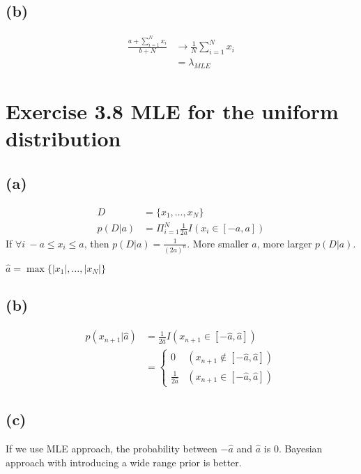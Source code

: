 \documentclass{jsarticle}
\begin{document}
\subsection*{(b)}
\begin{align}
\frac{a+\sum_{i=1}^{N}x_i}{b+N} & \rightarrow \frac{1}{N}\sum_{i=1}^{N}x_i\\
& = \lambda_{MLE}
\end{align}

\section*{Exercise 3.8 MLE for the uniform distribution}
\subsection*{(a)}
\begin{align}
D & = \{x_1, \dots, x_N\} \\
p(D|a) & = \Pi_{i=1}^{N}\frac{1}{2a}I(x_i\in [-a, a])
\end{align}
If $\forall i\ -a \leq x_i \leq a$, then $p(D|a)=\frac{1}{(2a)^n}$.
More smaller $a$, more larger $p(D|a)$.

$\hat{a}=\max \{|x_1|,\dots, |x_N| \}$

\subsection*{(b)}
\begin{align}
p(x_{n+1}|\hat{a}) & = \frac{1}{2\hat{a}}I(x_{n+1}\in[-\hat{a}, \hat{a}])\\
& = \begin{cases}
0 & (x_{n+1}\notin [-\hat{a}, \hat{a}])\\
\frac{1}{2\hat{a}} & (x_{n+1}\in [-\hat{a}, \hat{a}])
\end{cases} 
\end{align}

\subsection*{(c)}
If we use MLE approach, the probability between $-\hat{a}$ and $\hat{a}$ is 0.
Bayesian approach with introducing a wide range prior is better.
\end{document}
